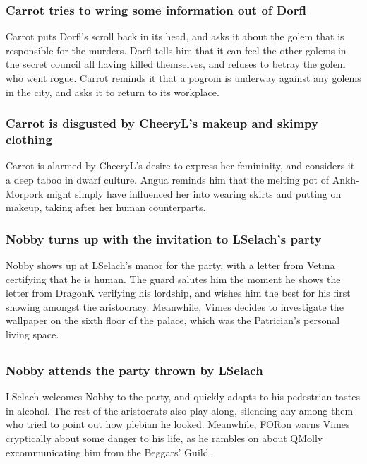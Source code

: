 \subsubsection{\Gls{Carrot} tries to wring some information out of \Gls{Dorfl}}
\Gls{Carrot} puts \Gls{Dorfl}'s scroll back in its head, and asks it about the golem that is
responsible for the murders. \Gls{Dorfl} tells him that it can feel the other golems in the secret
council all having killed themselves, and refuses to betray the golem who went rogue. \Gls{Carrot}
reminds it that a pogrom is underway against any golems in the city, and asks it to return to its
workplace.

\subsubsection{\Gls{Carrot} is disgusted by \Gls{CheeryL}'s makeup and skimpy clothing}
\Gls{Carrot} is alarmed by \Gls{CheeryL}'s desire to express her femininity, and considers it a
deep taboo in dwarf culture. \Gls{Angua} reminds him that the melting pot of Ankh-Morpork might
simply have influenced her into wearing skirts and putting on makeup, taking after her human
counterparts.

\subsubsection{\Gls{Nobby} turns up with the invitation to \Gls{LSelach}'s party}
\Gls{Nobby} shows up at \Gls{LSelach}'s manor for the party, with a letter from \Gls{Vetina}
certifying that he is human. The guard salutes him the moment he shows the letter from \Gls{DragonK}
verifying his lordship, and wishes him the best for his first showing amongst the aristocracy.
Meanwhile, \Gls{Vimes} decides to investigate the wallpaper on the sixth floor of the palace, which
was the Patrician's personal living space.

\subsection{}
\subsubsection{\Gls{Nobby} attends the party thrown by \Gls{LSelach}}
\Gls{LSelach} welcomes \Gls{Nobby} to the party, and quickly adapts to his pedestrian tastes in
alcohol. The rest of the aristocrats also play along, silencing any among them who tried to point
out how plebian he looked. Meanwhile, \Gls{FORon} warns \Gls{Vimes} cryptically about some danger
to his life, as he rambles on about \Gls{QMolly} excommunicating him from the Beggars' Guild.

